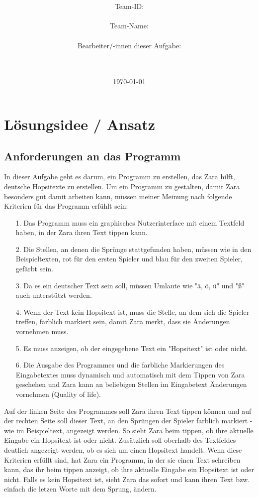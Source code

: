 \documentclass[a4paper,10pt,ngerman]{scrartcl}
\title{\textbf{\Huge\Aufgabe}}
\author{\LARGE Team-ID: \LARGE \TeamId \\\\
	    \LARGE Team-Name: \LARGE \TeamName \\\\
	    \LARGE Bearbeiter/-innen dieser Aufgabe: \\ 
	    \LARGE \Namen\\\\}
\date{\LARGE\today}
\begin{document}
\maketitle
\tableofcontents

\vspace{0.5cm}

\section{Lösungsidee / Ansatz}
\subsection{Anforderungen an das Programm}
In dieser Aufgabe geht es darum, ein Programm zu erstellen, das Zara hilft, deutsche Hopsitexte zu erstellen. 
Um ein Programm zu gestalten, damit Zara besonders gut damit arbeiten kann, müssen meiner Meinung nach folgende Kriterien für das Programm erfühlt sein: 
\begin{itemize}
    \item[1.]Das Programm muss ein graphisches Nutzerinterface mit einem Textfeld haben, in der Zara ihren Text tippen kann.
    \item[2.]Die Stellen, an denen die Sprünge stattgefunden haben, müssen wie in den Beispieltexten, rot für den ersten Spieler und blau für den zweiten Spieler, gefärbt sein.
    \item[3.]Da es ein deutscher Text sein soll, müssen Umlaute wie "ä, ö, ü" und "ß" auch unterstützt werden.
    \item[4.]Wenn der Text kein Hopsitext ist, muss die Stelle, an dem sich die Spieler treffen, farblich markiert sein, damit Zara merkt, dass sie Änderungen vornehmen muss.
    \item[5.]Es muss anzeigen, ob der eingegebene Text ein "Hopsitext" ist oder nicht.
    \item[6.]Die Ausgabe des Programmes und die farbliche Markierungen des Eingabetextes muss dynamisch und automatisch mit dem Tippen von Zara geschehen und Zara kann an beliebigen Stellen im Eingabetext Änderungen vornehmen (Quality of life).
\end{itemize}
Auf der linken Seite des Programmes soll Zara ihren Text tippen können und auf der rechten Seite soll dieser Text, an den Sprüngen der Spieler farblich markiert - wie im Beispieltext, angezeigt werden.
So sieht Zara beim tippen, ob ihre aktuelle Eingabe ein Hopsitext ist oder nicht. Zusätzlich soll oberhalb des Textfeldes deutlich angezeigt werden, ob es sich um einen Hopsitext handelt.
Wenn diese Kriterien erfüllt sind, hat Zara ein Programm, in der sie einen Text schreiben kann, das ihr beim tippen anzeigt, ob ihre aktuelle Eingabe ein Hopsitext ist oder nicht. Falls es kein Hopsitext ist, sieht Zara das sofort und kann ihren Text bzw. einfach die letzen Worte mit dem Sprung, ändern.
\end{document}
